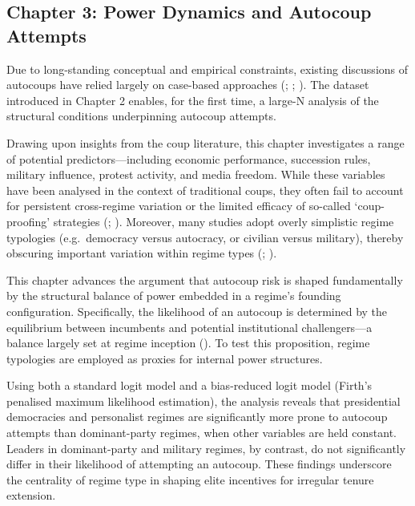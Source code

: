 \documentclass[
  12pt,
]{report}
\begin{document}
\subsection*{Chapter 3: Power Dynamics and Autocoup
Attempts}\label{chapter-3-power-dynamics-and-autocoup-attempts}

Due to long-standing conceptual and empirical constraints, existing
discussions of autocoups have relied largely on case-based approaches
(;
;
). The dataset
introduced in Chapter 2 enables, for the first time, a large-N analysis
of the structural conditions underpinning autocoup attempts.

Drawing upon insights from the coup literature, this chapter
investigates a range of potential predictors---including economic
performance, succession rules, military influence, protest activity, and
media freedom. While these variables have been analysed in the context
of traditional coups, they often fail to account for persistent
cross-regime variation or the limited efficacy of so-called
`coup-proofing' strategies (; ). Moreover, many studies
adopt overly simplistic regime typologies (e.g.~democracy versus
autocracy, or civilian versus military), thereby obscuring important
variation within regime types (; ).

This chapter advances the argument that autocoup risk is shaped
fundamentally by the structural balance of power embedded in a regime's
founding configuration. Specifically, the likelihood of an autocoup is
determined by the equilibrium between incumbents and potential
institutional challengers---a balance largely set at regime inception
(). To test
this proposition, regime typologies are employed as proxies for internal
power structures.

Using both a standard logit model and a bias-reduced logit model
(Firth's penalised maximum likelihood estimation), the analysis reveals
that presidential democracies and personalist regimes are significantly
more prone to autocoup attempts than dominant-party regimes, when other
variables are held constant. Leaders in dominant-party and military
regimes, by contrast, do not significantly differ in their likelihood of
attempting an autocoup. These findings underscore the centrality of
regime type in shaping elite incentives for irregular tenure extension.
\end{document}
